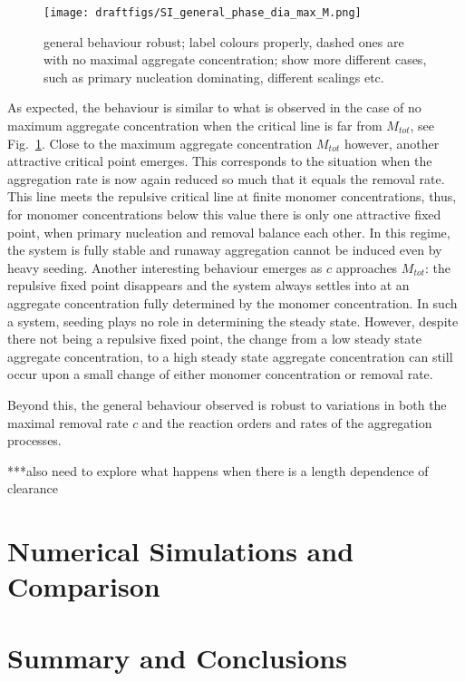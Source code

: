 \begin{figure}[h] %
        \centering
        \texttt{[image: draftfigs/SI\_general\_phase\_dia\_max\_M.png]}
	\caption{general behaviour robust; label colours properly, dashed ones are with no maximal aggregate concentration; show more different cases, such as primary nucleation dominating, different scalings etc.}
	\label{fig:SI_general_phase_dia_max_M}
\end{figure}
As expected, the behaviour is similar to what is observed in the case of no maximum aggregate concentration when the critical line is far from $M_{tot}$, see Fig.~\ref{fig:SI_general_phase_dia_max_M}. Close to the maximum aggregate concentration $M_{tot}$ however, another attractive critical point emerges. This corresponds to the situation when the aggregation rate is now again reduced so much that it equals the removal rate. This line meets the repulsive critical line at finite monomer concentrations, thus, for monomer concentrations below this value there is only one attractive fixed point, when primary nucleation and removal balance each other. In this regime, the system is fully stable and runaway aggregation cannot be induced even by heavy seeding. Another interesting behaviour emerges as $c$ approaches $M_{tot}$: the repulsive fixed point disappears and the system always settles into at an aggregate concentration fully determined by the monomer concentration. In such a system, seeding plays no role in determining the steady state. However, despite there not being a repulsive fixed point, the change from a low steady state aggregate concentration, to a high steady state aggregate concentration can still occur upon a small change of either monomer concentration or removal rate. 

Beyond this, the general behaviour observed is robust to variations in both the maximal removal rate $c$ and the reaction orders and rates of the aggregation processes.

***also need to explore what happens when there is a length dependence of clearance

\section{}
\subsection{}

\section{}

\section{Numerical Simulations and Comparison}

\section{Summary and Conclusions}
